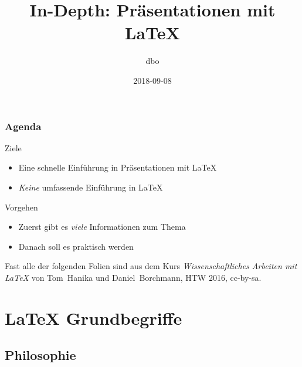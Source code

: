 \documentclass{cms-kurs}
\begin{document}
\title{In-Depth: Präsentationen mit \LaTeX{}}
\author{dbo}
\date{2018-09-08}

\maketitle{}

\begin{frame}
  \frametitle{Agenda}

  \onslide<+->

  \vfill

  \begin{block}{Ziele}
    \begin{itemize}
    \item Eine schnelle Einführung in Präsentationen mit \LaTeX{}
    \item \emph{Keine} umfassende Einführung in \LaTeX{}
    \end{itemize}
  \end{block}

  \vfill

  \onslide<+->

  \begin{block}{Vorgehen}
    \begin{itemize}
    \item Zuerst gibt es \emph{viele} Informationen zum Thema
    \item Danach soll es praktisch werden
    \end{itemize}
  \end{block}

  \bigskip{}

  \onslide<+->

  Fast alle der folgenden Folien sind aus dem Kurs \emph{Wissenschaftliches
    Arbeiten mit \LaTeX} von Tom~Hanika und Daniel~Borchmann, HTW 2016,
  cc-by-sa.

\end{frame}

\section{\LaTeX{} Grundbegriffe}

\subsection{Philosophie}
\end{document}
